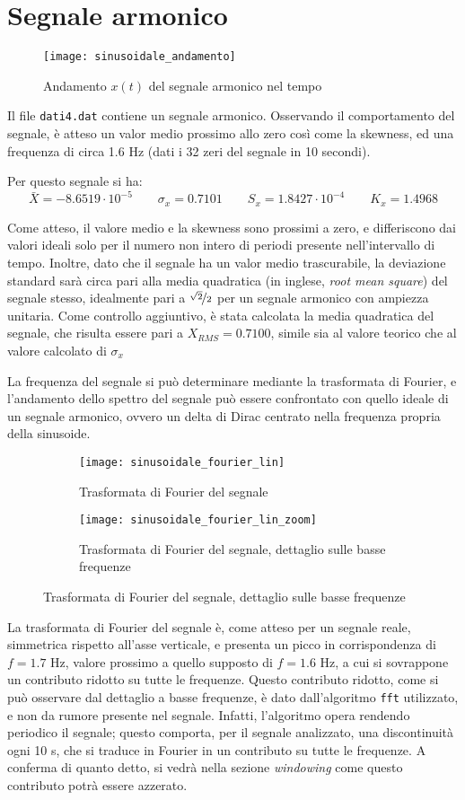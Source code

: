 \documentclass{article} %
\begin{document}
\section{Segnale armonico}
\begin{figure}[ht!]
	\centering
	\texttt{[image: sinusoidale\_andamento]}
	\caption{Andamento $x(t)$ del segnale armonico nel tempo}
\end{figure}
Il file \texttt{dati4.dat} contiene un segnale armonico. Osservando il comportamento del segnale, è atteso un valor medio prossimo allo zero così come la skewness, ed una frequenza di circa 1.6 Hz (dati i 32 zeri del segnale in 10 secondi).\par
Per questo segnale si ha:
$$ \bar{X} = -8.6519\cdot10^{-5} \qquad \sigma_{x} = 0.7101 \qquad S_{x} = 1.8427\cdot10^{-4} \qquad K_{x} = 1.4968 $$\par
Come atteso, il valore medio e la skewness sono prossimi a zero, e differiscono dai valori ideali solo per il numero non intero di periodi presente nell'intervallo di tempo. Inoltre, dato che il segnale ha un valor medio trascurabile, la deviazione standard sarà circa pari alla media quadratica (in inglese, \textit{root mean square}) del segnale stesso, idealmente pari a $\nicefrac{\sqrt{2}}{2}$ per un segnale armonico con ampiezza unitaria. Come controllo aggiuntivo, è stata calcolata la media quadratica del segnale, che risulta essere pari a $X_{RMS} = 0.7100$, simile sia al valore teorico che al valore calcolato di $\sigma_{x}$\par
La frequenza del segnale si può determinare mediante la trasformata di Fourier, e l'andamento dello spettro del segnale può essere confrontato con quello ideale di un segnale armonico, ovvero un delta di Dirac centrato nella frequenza propria della sinusoide.
\begin{figure}[ht!]
	\begin{subfigure}{0.5\textwidth}
		\texttt{[image: sinusoidale\_fourier\_lin]}
		\caption{Trasformata di Fourier del segnale}
	\end{subfigure}
	\begin{subfigure}{0.5\textwidth}
		\texttt{[image: sinusoidale\_fourier\_lin\_zoom]}
		\caption{Trasformata di Fourier del segnale, dettaglio sulle basse frequenze}
	\end{subfigure}
\end{figure}\par
La trasformata di Fourier del segnale è, come atteso per un segnale reale, simmetrica rispetto all'asse verticale, e presenta un picco in corrispondenza di $f = 1.7$ Hz, valore prossimo a quello supposto di $f = 1.6$ Hz, a cui si sovrappone un contributo ridotto su tutte le frequenze. Questo contributo ridotto, come si può osservare dal dettaglio a basse frequenze, è dato dall'algoritmo \texttt{fft} utilizzato, e non da rumore presente nel segnale. Infatti, l'algoritmo opera rendendo periodico il segnale; questo comporta, per il segnale analizzato, una discontinuità ogni 10 s, che si traduce in Fourier in un contributo su tutte le frequenze. A conferma di quanto detto, si vedrà nella sezione \textit{windowing} come questo contributo potrà essere azzerato.
\end{document}
